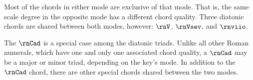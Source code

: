 
Most of the chords in either mode are exclusive of that
mode. That is, the same scale degree in the opposite mode
has a different chord quality. Three diatonic chords are
shared between both modes, however: $\rnV$, $\rnVsev$, and
$\rnviio$. 

The $\rnCad$ is a special case among the diatonic triads.
Unlike all other Roman numerals, which have one and only one
associated chord quality, a $\rnCad$ may be a major or minor
triad, depending on the key's mode. In addition to the
$\rnCad$ chord, there are other special chords shared
between the two modes.


